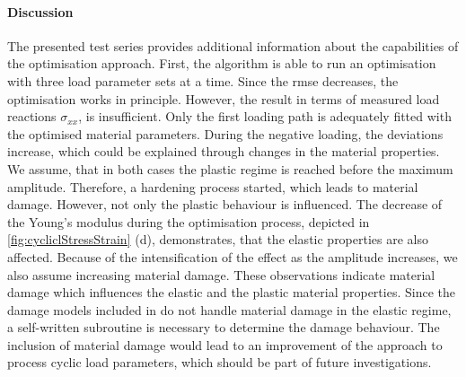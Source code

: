 \paragraph{Discussion}
The presented test series provides additional information about the capabilities of the optimisation approach. First, the algorithm is able to run an optimisation with three load parameter sets at a time. Since the \acrshort{rmse} decreases, the optimisation works in principle.
However, the result in terms of measured load reactions $\sigma_{xx}$, is insufficient.
Only the first loading path is adequately fitted with the optimised material parameters.
During the negative loading, the deviations increase, which could be explained through changes in the material properties.
We assume, that in both cases the plastic regime is reached before the maximum amplitude. Therefore, a hardening process started, which leads to material damage. However, not only the plastic behaviour is influenced.
The decrease of the Young's modulus during the optimisation process, depicted in \autoref{fig:cycliclStressStrain} (d), demonstrates, that the elastic properties are also affected.
Because of the intensification of the effect as the amplitude increases, we also assume increasing material damage.
These observations indicate material damage which influences the elastic and the plastic material properties. Since the damage models included in  do not handle material damage in the elastic regime, a self-written subroutine is necessary to determine the damage behaviour. The inclusion of material damage would lead to an improvement of the approach to process cyclic load parameters, which should be part of future investigations. 










